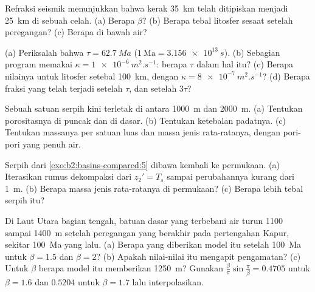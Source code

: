 \begin{exercise}[$\star$]\label{exo:b2:basins-compared:3}
Refraksi seismik menunjukkan bahwa kerak \qty{35}{km} telah ditipiskan menjadi \qty{25}{km} di sebuah celah.
(a) Berapa $\beta$? (b) Berapa tebal litosfer sesaat setelah peregangan? (c) Berapa
 di bawah air?
\end{exercise}

\begin{exercise}[$\star$]\label{exo:b2:basins-compared:4}
(a) Periksalah bahwa $\tau = \qty{62.7}{Ma}$ ($1~\text{Ma} = \qty{3.156e13}{s}$). (b) Sebagian program
memakai $\kappa = \qty{1e-6}{m^2.s^{-1}}$: berapa $\tau$ dalam hal itu? (c) Berapa nilainya untuk
litosfer setebal \qty{100}{km}, dengan $\kappa = \qty{8e-7}{m^2.s^{-1}}$? (d) Berapa fraksi
 yang telah terjadi setelah $\tau$, dan setelah $3\tau$?
\end{exercise}

\begin{exercise}[$\star\star$]\label{exo:b2:basins-compared:5}
Sebuah satuan serpih kini terletak di antara \qty{1000}{m} dan \qty{2000}{m}. (a) Tentukan porositasnya di
puncak dan di dasar. (b) Tentukan ketebalan padatnya. (c) Tentukan massanya per satuan luas dan massa jenis
rata-ratanya, dengan pori-pori yang penuh air.
\end{exercise}

\begin{exercise}[$\star\star$]\label{exo:b2:basins-compared:6}
Serpih dari \cref{exo:b2:basins-compared:5} dibawa kembali ke permukaan. (a) Iterasikan
rumus dekompaksi dari $z_2' = T_s$ sampai perubahannya kurang dari \qty{1}{m}. (b) Berapa
massa jenis rata-ratanya di permukaan? (c) Berapa lebih tebal serpih itu?
\end{exercise}

\begin{exercise}[$\star\star$]\label{exo:b2:basins-compared:7}
Di Laut Utara bagian tengah, batuan dasar yang terbebani air turun 1100 sampai \qty{1400}{m} setelah
peregangan yang berakhir pada pertengahan Kapur, sekitar \qty{100}{Ma} yang lalu. (a) Berapa 
yang diberikan model itu setelah \qty{100}{Ma} untuk $\beta = 1.5$ dan $\beta = 2$? (b) Apakah
nilai-nilai itu mengapit pengamatan? (c) Untuk $\beta$ berapa model itu memberikan \qty{1250}{m}?
Gunakan $\frac{\beta}{\pi}\sin\frac{\pi}{\beta} = 0.4705$ untuk $\beta = 1.6$ dan $0.5204$ untuk $\beta
= 1.7$ lalu interpolasikan.
\end{exercise}

